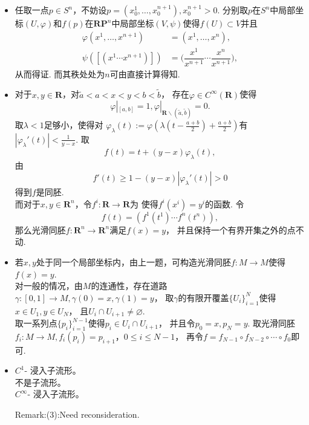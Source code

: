 \begin{itemize}
    \item[25.]
    任取一点$p\in S^{n}$，不妨设$p=(x_{0}^{1},\ldots,x_{0}^{n+1}), x_{0}^{n+1}>0$.
    分别取$p$在$S^{n}$中局部坐标$(U,\varphi)$和$f(p)$在$\mathbf{RP}^{n}$中局部坐标$(V,\psi)$使得$f(U) \subset V$并且
    \begin{align*}
        \varphi(x^{1},\ldots,x^{n+1})&=(x^{1},\ldots,x^{n}),\\
        \psi([(x^{1} \cdots x^{n+1})])&=\Big(\dfrac{x^{1}}{x^{n+1}}\cdots \dfrac{x^{n}}{x^{n+1}}\Big),
    \end{align*}
    从而得证. 而其秩处处为$n$可由直接计算得知.

    \item[26.]
    对于$x,y\in\mathbf{R}$，对$\tilde{a}<a<x<y<b<\tilde{b}$，
    存在$\varphi\in C^\infty(\mathbf{R})$使得
    \[
    \varphi|_{[a,b]}=1,\varphi|_{\mathbf{R}\backslash(\tilde{a},\tilde{b})}=0.
    \]
    取$\lambda<1$足够小，使得对
    $\varphi_\lambda(t):=\varphi(\lambda(t-\frac{a+b}{2})+\frac{a+b}{2})$有
    $|\varphi_\lambda'(t)|<\frac{1}{y-x}$.
    取
    \[f(t)=t+(y-x)\varphi_\lambda(t),\]
    由
    \[f'(t)\geq 1-(y-x)|\varphi_\lambda'(t)|>0\]
    得到$f$是同胚.
    \\
    而对于$x,y\in\mathbf{R}^n$，令$f^{i}:\mathbf{R}\to\mathbf{R}$为
    使得$f^{i}(x^{i})=y^{i}$的函数.
    令
    \[f(t)=(f^{1}(t^{1})\cdots f^{n}(t^{n})),\]
    那么光滑同胚$f:\mathbf{R}^n\to\mathbf{R}^n$满足$f(x)=y$，
    并且保持一个有界开集之外的点不动.

    \item[27.]
    若$x,y$处于同一个局部坐标内，由上一题，可构造光滑同胚$f:M\to M$使得$f(x)=y$.
    \\
    对一般的情况，由$M$的连通性，存在道路$\gamma:[0,1]\to M,\gamma(0)=x, \gamma(1)=y$，
    取$\gamma$的有限开覆盖$\{U_{i}\}_{i=1}^{N}$使得$x\in U_{1},y\in U_{N}$，
    且$U_{i}\cap U_{i+1} \ne \varnothing$.
    \\
    取一系列点$\{p_{i}\}_{i=1}^{N-1}$使得$p_{i}\in U_{i}\cap U_{i+1}$，
    并且令$p_{0}=x,p_{N}=y$.
    取光滑同胚$f_{i}:M\to M,f_{i}(p_{i})=p_{i+1}$，$0\leq i\leq N-1$，
    再令$f=f_{N-1}\circ f_{N-2} \circ \cdots \circ f_{0}$即可.
    
    \item[28.]
    $C^{1}$- 浸入子流形。
    \\
    不是子流形。
    \\
    $C^{\infty}$- 浸入子流形。

    Remark:(3):Need reconsideration.


\end{itemize}
